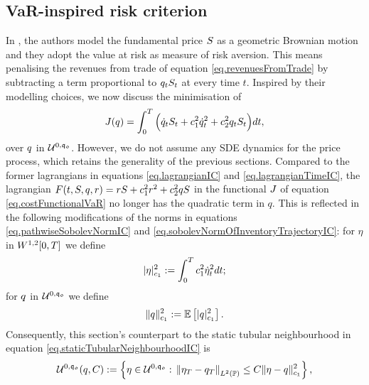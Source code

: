 \documentclass[10pt,a4paper]{article}
\begin{document}
	\subsection{VaR-inspired risk criterion}\label{sec.varInspiredRiskCriterion}
	In \cite{GS11opt}, the authors model the fundamental price $\fundamentalPrice$ as a geometric Brownian motion and they adopt the value at risk as measure of risk aversion. This means penalising the revenues from trade of equation \eqref{eq.revenuesFromTrade} by subtracting a term proportional to $\inventory_t \fundamentalPrice_t$ at every time $t$. Inspired by their modelling choices, we now discuss the minimisation of 
	\begin{equation}\label{eq.costFunctionalVaR}
	\costFunctional(\inventory)=
	\int_{0}^{\timeHorizon} 
	\Big(
	 \inventoryRate_{t} \fundamentalPrice_t + \coeffMarketImpact\squared \inventoryRate_{t}\squared + \coeffRiskAversion\squared \inventory_t \fundamentalPrice_t
	\Big)
	dt,
	\end{equation}
	over $\inventory$ in $\spaceUnbiasedInventoryTrajectoriesInitialConstraint$. However, we do not assume any SDE dynamics for the price process, which retains the generality of the previous sections. Compared to the former lagrangians in equations \eqref{eq.lagrangianIC} and \eqref{eq.lagrangianTimeIC}, the lagrangian $F(t,S,q,r)= r S + \coeffMarketImpact\squared r\squared + \coeffRiskAversion\squared q \fundamentalPrice$ in the functional $\costFunctional$ of equation \eqref{eq.costFunctionalVaR}  no longer has the quadratic term in $q$. This is reflected
	 in the following modifications of the norms in equations \eqref{eq.pathwiseSobolevNormIC} and \eqref{eq.sobolevNormOfInventoryTrajectoryIC}: for $\eta$ in $\sobolevSpaceOneTwo\timeWindow$ we define
	\begin{equation}\label{eq.pathwiseSobolevNormVaR}
	\lvert \eta \rvert \squared _{\coeffMarketImpact}:= \intZeroTimeHorizon \coeffMarketImpact\squared \dotEta\squared_t dt;
	\end{equation}
	for $\inventory$ in $\spaceUnbiasedInventoryTrajectoriesInitialConstraint$ we define
	\begin{equation}\label{eq.sobolevNormVaR}
	\lVert \inventory \rVert\squared_{\coeffMarketImpact}
	:=
	\Expectation \left[ \lvert \inventory \rvert_{\coeffMarketImpact}\squared \right].
	\end{equation}
	Consequently, this section's counterpart to the static tubular neighbourhood in equation \eqref{eq.staticTubularNeighbourhoodIC} is  
	\begin{equation}\label{eq.staticTubularNeighbourhoodVaR}
	\spaceUnbiasedInventoryTrajectoriesInitialConstraint (\inventory, C):=
	\left\lbrace
	\eta \in \spaceUnbiasedInventoryTrajectoriesInitialConstraint: \, 
	\norm[\eta_\timeHorizon -\inventory_\timeHorizon]_{\Ltwo(\Prob)} \leq 
	C \lVert \eta -\inventory\rVert\squared_{\coeffMarketImpact }
	\right\rbrace,
	\end{equation}
\end{document}
